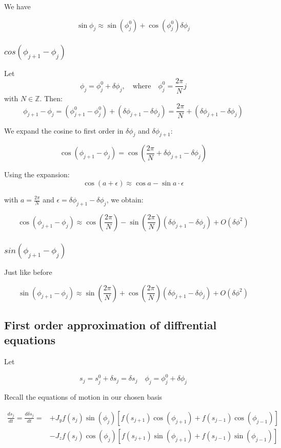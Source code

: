 \documentclass{article}
\begin{document}
We have 

\[
\boxed{
\sin\phi_j \approx \sin(\phi_j^0) + \cos(\phi_j^0)\delta\phi_j
}
\]

\subsubsection{$cos(\phi_{j+1} - \phi_j)$}

Let
\[
\phi_j = \phi_j^0 + \delta \phi_j, \quad \text{where} \quad \phi_j^0 = \frac{2\pi}{N} j
\]
with \( N \in \mathbb{Z} \). Then:
\[
\phi_{j+1} - \phi_j = \left( \phi_{j+1}^0 - \phi_j^0 \right) + \left( \delta \phi_{j+1} - \delta \phi_j \right) = \frac{2\pi}{N} + (\delta \phi_{j+1} - \delta \phi_j)
\]

We expand the cosine to first order in \( \delta \phi_j \) and \( \delta \phi_{j+1} \):

\[
\cos(\phi_{j+1} - \phi_j) = \cos\left( \frac{2\pi}{N} + \delta \phi_{j+1} - \delta \phi_j \right)
\]

Using the expansion:
\[
\cos(a + \epsilon) \approx \cos a - \sin a \cdot \epsilon
\]

with \( a = \frac{2\pi}{N} \) and \( \epsilon = \delta \phi_{j+1} - \delta \phi_j \), we obtain:

\[
\boxed{
\cos(\phi_{j+1} - \phi_j) \approx \cos\left( \frac{2\pi}{N} \right) - \sin\left( \frac{2\pi}{N} \right)(\delta \phi_{j+1} - \delta \phi_j) + O(\delta \phi ^2)
}
\]


\subsubsection{$sin(\phi_{j+1} - \phi_j)$}

Just like before

\[
\boxed{
\sin(\phi_{j+1} - \phi_j) \approx \sin\left( \frac{2\pi}{N} \right) + \cos\left( \frac{2\pi}{N} \right)(\delta \phi_{j+1} - \delta \phi_j) + O(\delta \phi ^2)
}
\]

\subsection{First order approximation of diffrential equations}

Let 

\[
s_j = s_j^0 + \delta s_j = \delta s_j \quad \phi_j = \phi_j^0 + \delta\phi_j
\]

Recall the equations of motion in our chosen basis

\begin{align*}
    \frac{ds_j}{dt} = \frac{d\delta s_j}{dt} = &+J_yf(s_j)\sin(\phi_j)[f(s_{j+1})\cos(\phi_{j+1}) + f(s_{j-1})\cos(\phi_{j-1})] \\
                      &-J_zf(s_j)\cos(\phi_j)[f(s_{j+1})\sin(\phi_{j+1}) + f(s_{j-1})\sin(\phi_{j-1})]
\end{align*}
\end{document}
